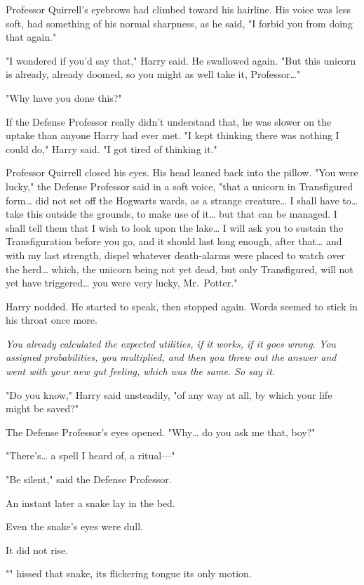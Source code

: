 Professor Quirrell's eyebrows had climbed toward his hairline. His voice was
less soft, had something of his normal sharpness, as he said, "I forbid you
from doing that again."

"I wondered if you'd say that," Harry said. He swallowed again. "But this
unicorn is already, already doomed, so you might as well take it,
Professor{\ldots}"

"Why have you done this?"

If the Defense Professor really didn't understand that, he was slower on the
uptake than anyone Harry had ever met. "I kept thinking there was nothing I
could do," Harry said. "I got tired of thinking it."

Professor Quirrell closed his eyes. His head leaned back into the pillow. "You
were lucky," the Defense Professor said in a soft voice, "that a unicorn in
Transfigured form{\ldots} did not set off the Hogwarts wards, as a strange
creature{\ldots} I shall have to{\ldots} take this outside the grounds, to make
use of it{\ldots} but that can be managed. I shall tell them that I wish to
look upon the lake{\ldots} I will ask you to sustain the Transfiguration before
you go, and it should last long enough, after that{\ldots} and with my last
strength, dispel whatever death-alarms were placed to watch over the
herd{\ldots} which, the unicorn being not yet dead, but only Transfigured, will
not yet have triggered{\ldots} you were very lucky, Mr.~Potter."

Harry nodded. He started to speak, then stopped again. Words seemed to stick in
his throat once more.

\emph{You already calculated the expected utilities, if it works, if it goes
wrong. You assigned probabilities, you multiplied, and then you threw out the
answer and went with your new gut feeling, which was the same. So say it.}

"Do you know," Harry said unsteadily, "of any way at all, by which your life
might be saved?"

The Defense Professor's eyes opened. "Why{\ldots} do you ask me that, boy?"

"There's{\ldots} a spell I heard of, a ritual---"

"Be silent," said the Defense Professor.

An instant later a snake lay in the bed.

Even the snake's eyes were dull.

It did not rise.

"" hissed that snake, its flickering tongue its only motion.

